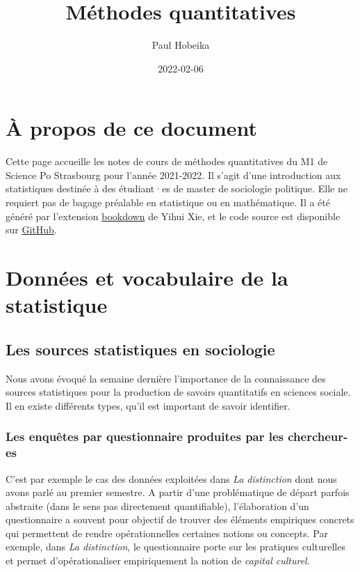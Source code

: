 \documentclass[
]{book}
\title{Méthodes quantitatives}
\author{Paul Hobeika}
\date{2022-02-06}
\begin{document}
\maketitle

{
\setcounter{tocdepth}{1}
\tableofcontents
}
\hypertarget{uxe0-propos-de-ce-document}{%
\chapter*{À propos de ce document}\label{uxe0-propos-de-ce-document}}

Cette page accueille les notes de cours de méthodes quantitatives du M1 de Science Po Strasbourg pour l'année 2021-2022. Il s'agit d'une introduction aux statistiques destinée à des étudiant·es de master de sociologie politique. Elle ne requiert pas de bagage préalable en statistique ou en mathématique. Il a été généré par l'extension \href{https://bookdown.org/}{bookdown} de Yihui Xie, et le code source est disponible sur \href{https://github.com/phobeika/quanti}{GitHub}.

\hypertarget{donnuxe9es-et-vocabulaire-de-la-statistique}{%
\chapter{Données et vocabulaire de la statistique}\label{donnuxe9es-et-vocabulaire-de-la-statistique}}

\hypertarget{les-sources-statistiques-en-sociologie}{%
\section{Les sources statistiques en sociologie}\label{les-sources-statistiques-en-sociologie}}

Nous avons évoqué la semaine dernière l'importance de la connaissance des sources statistiques pour la production de savoirs quantitatifs en sciences sociale. Il en existe différents types, qu'il est important de savoir identifier.

\hypertarget{les-enquuxeates-par-questionnaire-produites-par-les-chercheur-es}{%
\subsection{Les enquêtes par questionnaire produites par les chercheur-es}\label{les-enquuxeates-par-questionnaire-produites-par-les-chercheur-es}}

C'est par exemple le cas des données exploitées dans \emph{La distinction} \citep{bourdieu1979} dont nous avons parlé au premier semestre. A partir d'une problématique de départ parfois abstraite (dans le sens pas directement quantifiable), l'élaboration d'un questionnaire a souvent pour objectif de trouver des éléments empiriques concrets qui permettent de rendre opérationnelles certaines notions ou concepts. Par exemple, dans \emph{La distinction}, le questionnaire porte sur les pratiques culturelles et permet d'opérationaliser empiriquement la notion de \emph{capital culturel}.
\end{document}
